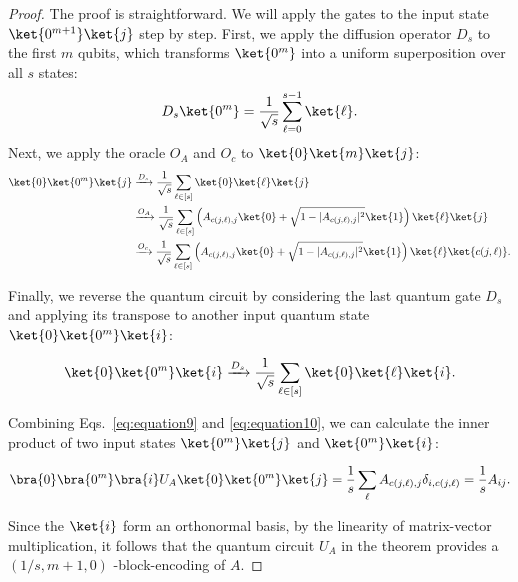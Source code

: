 \documentclass{article}
\begin{document}
\begin{proof}
  The proof is straightforward. We will apply the gates to the input state $\ket{0^{m+1}}\ket{j}$ step by step.
  First, we apply the diffusion operator $D_s$ to the first $m$ qubits, which transforms $\ket{0^m}$ into a uniform superposition over all $s$ states:
  \begin{equation}
    D_s \ket{0^m} = \frac{1}{\sqrt{s}} \sum_{\ell=0}^{s-1} \ket{\ell}.\label{eq:equation8}
  \end{equation}
  Next, we apply the oracle $O_A$ and $O_c$ to $\ket{0}\ket{m}\ket{j}$:
  \begin{equation}
    \begin{aligned}
      \ket{0} \ket{0^m} \ket{j}
      &\xrightarrow{D_s} \frac{1}{\sqrt{s}} \sum_{\ell \in [s]} \ket{0} \ket{\ell} \ket{j} \\
      &\xrightarrow{O_A} \frac{1}{\sqrt{s}} \sum_{\ell \in [s]} \left( A_{c(j, \ell), j} \ket{0} + \sqrt{1 - |A_{c(j, \ell), j}|^2} \ket{1} \right) \ket{\ell} \ket{j} \\
      &\xrightarrow{O_c} \frac{1}{\sqrt{s}} \sum_{\ell \in [s]} \left( A_{c(j, \ell), j} \ket{0} + \sqrt{1 - |A_{c(j, \ell), j}|^2} \ket{1} \right) \ket{\ell} \ket{c(j, \ell)}.
    \end{aligned}\label{eq:equation9}
  \end{equation}

  Finally, we reverse the quantum circuit by considering the last quantum gate $D_s$ and applying its transpose to another input quantum state $\ket{0}\ket{0^m}\ket{i}$:

  \begin{equation}
    \ket{0} \ket{0^m} \ket{i}
    \xrightarrow{D_s} \frac{1}{\sqrt{s}} \sum_{\ell \in [s]} \ket{0} \ket{\ell} \ket{i}\label{eq:equation10}.
  \end{equation}

  Combining Eqs.~\eqref{eq:equation9} and \eqref{eq:equation10}, we can calculate the inner product of two input states $\ket{0^m}\ket{j}$ and $\ket{0^m}\ket{i}$:

  \begin{equation}
    \bra{0} \bra{0^m} \bra{i} U_A \ket{0} \ket{0^m} \ket{j}
    = \frac{1}{s} \sum_{\ell} A_{c(j, \ell), j} \delta_{i, c(j, \ell)}
    = \frac{1}{s} A_{ij}.\label{eq:equation11}
  \end{equation}

  Since the $\ket{i}$ form an orthonormal basis, by the linearity of matrix-vector multiplication, it follows that the quantum circuit $U_A$ in the theorem provides a $(1/s,m+1,0)$ -block-encoding of $A$.

\end{proof}
\end{document}
